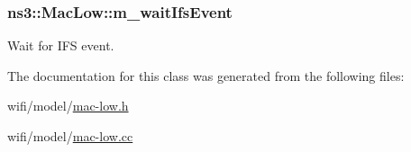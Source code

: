 \subsubsection[{\texorpdfstring{m\+\_\+wait\+Ifs\+Event}{m_waitIfsEvent}}]{ ns3\+::\+Mac\+Low\+::m\+\_\+wait\+Ifs\+Event\hspace{0.3cm}{\ttfamily [private]}}\hypertarget{classns3_1_1MacLow_abdfe679a569b3b5b3262b08ccc8f5df8}{}\label{classns3_1_1MacLow_abdfe679a569b3b5b3262b08ccc8f5df8}


Wait for I\+FS event. 



The documentation for this class was generated from the following files\+:\begin{DoxyCompactItemize}
\item 
wifi/model/\hyperlink{mac-low_8h}{mac-\/low.\+h}\item 
wifi/model/\hyperlink{mac-low_8cc}{mac-\/low.\+cc}\end{DoxyCompactItemize}
